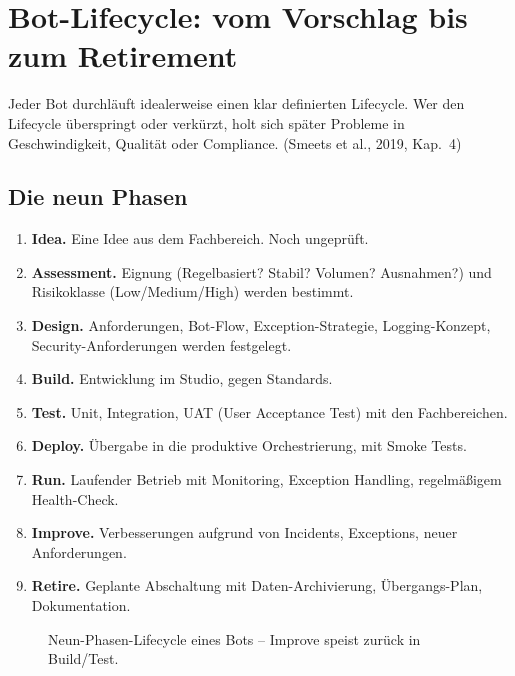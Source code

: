 \documentclass[11pt,a4paper,oneside]{article}
\newcommand{\fachbegriff}[1]{\textbf{#1}}
\newcommand{\quelle}[1]{{\footnotesize\color{lpGray}(#1)}}
\begin{document}
\section{Bot-Lifecycle: vom Vorschlag bis zum Retirement}

Jeder Bot durchläuft idealerweise einen klar definierten Lifecycle. Wer den Lifecycle überspringt oder verkürzt, holt sich später Probleme in Geschwindigkeit, Qualität oder Compliance. \quelle{Smeets et al., 2019, Kap.~4}

\subsection{Die neun Phasen}

\begin{enumerate}
  \item \fachbegriff{Idea.} Eine Idee aus dem Fachbereich. Noch ungeprüft.
  \item \fachbegriff{Assessment.} Eignung (Regelbasiert? Stabil? Volumen? Ausnahmen?) und Risikoklasse (Low/Medium/High) werden bestimmt.
  \item \fachbegriff{Design.} Anforderungen, Bot-Flow, Exception-Strategie, Logging-Konzept, Security-Anforderungen werden festgelegt.
  \item \fachbegriff{Build.} Entwicklung im Studio, gegen Standards.
  \item \fachbegriff{Test.} Unit, Integration, UAT (User Acceptance Test) mit den Fachbereichen.
  \item \fachbegriff{Deploy.} Übergabe in die produktive Orchestrierung, mit Smoke Tests.
  \item \fachbegriff{Run.} Laufender Betrieb mit Monitoring, Exception Handling, regelmäßigem Health-Check.
  \item \fachbegriff{Improve.} Verbesserungen aufgrund von Incidents, Exceptions, neuer Anforderungen.
  \item \fachbegriff{Retire.} Geplante Abschaltung mit Daten-Archivierung, Übergangs-Plan, Dokumentation.
\end{enumerate}

\begin{figure}[h]
\centering
{}
\caption{\sffamily Neun-Phasen-Lifecycle eines Bots -- Improve speist zurück in Build/Test.}
\end{figure}
\end{document}
